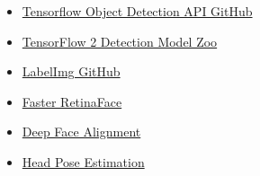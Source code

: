 \documentclass[a4paper, 12pt]{article}
\begin{document}
\begin{flushleft}
\begin{itemize}
    \item \label{Ref9} \href{https://github.com/tensorflow/models/tree/master/research/object_detection}{Tensorflow Object Detection API GitHub}
    \item \label{Ref10} \href{https://github.com/tensorflow/models/blob/master/research/object_detection/g3doc/tf2_detection_zoo.md}{TensorFlow 2 Detection Model Zoo}
    \item \label{Ref11} \href{https://github.com/tzutalin/labelImg}{LabelImg GitHub}
    \item \label{Ref12} \href{https://github.com/1996scarlet/faster-mobile-retinaface}{Faster RetinaFace}
    \item \label{Ref13} \href{https://github.com/deepinx/deep-face-alignment}{Deep Face Alignment}
    \item \label{Ref14} \href{https://github.com/lincolnhard/head-pose-estimation}{Head Pose Estimation}
\end{itemize}
\end{flushleft}
\end{document}
